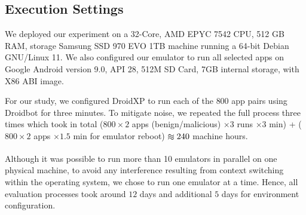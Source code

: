 \subsection{Execution Settings}\label{sec:hardware}

We deployed our experiment on a 32-Core, AMD EPYC 7542 CPU, 512 GB RAM, storage Samsung SSD 970 EVO 1TB machine running a 64-bit Debian  GNU/Linux 11. We also configured our emulator to run all selected apps on Google Android version 9.0, API 28, 512M SD Card, 7GB internal storage, with X86 ABI image.

For our study, we configured DroidXP to run each of the $800$ app pairs using Droidbot for three minutes. To mitigate noise, we repeated the full process three times which took in total ($800 \times 2$ apps (benign/malicious) $\times 3$ runs $\times 3$ min) + ($800 \times 2$ apps $\times 1.5$ min for emulator reboot) $\apeq 240$ machine hours.


Although it was possible to run more than 10 emulators in parallel on one physical machine, to avoid any interference resulting from context switching within the operating system, we chose to run one emulator at a time. Hence, all evaluation processes took around $12$ days and additional $5$ days for environment configuration.



